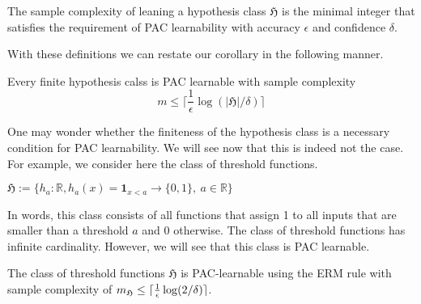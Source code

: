     \begin{definition}
		The sample complexity of leaning a hypothesis class $\mathfrak{H}$ is
		the minimal integer that satisfies the requirement of PAC learnability
		with accuracy $\epsilon$ and confidence $\delta$.
	\end{definition}
	With these definitions we can restate our corollary in the following manner.
	\begin{coro}
		Every finite hypothesis calss is PAC learnable with sample complexity 
		$$
		m \leq \lceil \frac{1}{\epsilon} \log(|\mathfrak{H}|/\delta) \rceil
		$$
	\end{coro}
One may wonder whether the finiteness of the hypothesis class is a necessary
condition for PAC learnability. We will see now that this is indeed not the
case. For example, we consider here the class of threshold functions. 
\begin{definition}
	$\mathfrak{H} := \{h_a:\mathbb{R}, h_a(x)= \mathbf{1}_{x <a} \to \{0,1\},\  a\in \mathbb{R}\}$
\end{definition}	
In words, this class consists of all functions that assign 1 to all inputs that
are smaller than a threshold $a$ and 0 otherwise. The class of threshold
functions has infinite cardinality. However, we will see that this class is PAC learnable.
\begin{lemma}
The class of threshold functions	$\mathfrak{H}$ is PAC-learnable using the ERM rule with sample complexity of
	$m_\frak{H} \leq \lceil \frac{1}{\epsilon}\log (2/\delta)\rceil$.
\end{lemma}
